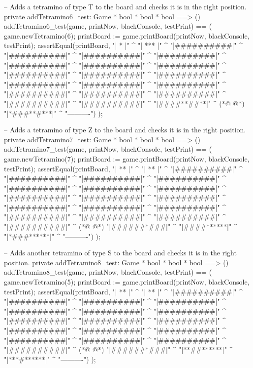 \begin{vdmpp}[breaklines=true]
  -- Adds a tetramino of type T to the board and checks it is in the right position.
  private addTetramino6_test: Game * bool * bool * bool ==> ()
  addTetramino6_test(game, printNow, blackConsole, testPrint) == (  
   game.newTetramino(6);
   printBoard := game.printBoard(printNow, blackConsole, testPrint);
   assertEqual(printBoard, 
    "\n|    *     |" ^
    "\n|   ***    |" ^
    "\n|##########|" ^
    "\n|##########|" ^
    "\n|##########|" ^
    "\n|##########|" ^
    "\n|##########|" ^
    "\n|##########|" ^
    "\n|##########|" ^
    "\n|##########|" ^
    "\n|##########|" ^
    "\n|##########|" ^
    "\n|##########|" ^
    "\n|##########|" ^
    "\n|##########|" ^
    "\n|##########|" ^
    "\n|##########|" ^
    "\n|##########|" ^
    "\n|##########|" ^
    "\n|##########|" ^
    "\n|####**##**|" ^
(*@
\label{addTetramino7:test:222}
@*)
    "\n|*###**#***|" ^
    "\n ----------")
  );

  -- Adds a tetramino of type Z to the board and checks it is in the right position.
  private addTetramino7_test: Game * bool * bool * bool ==> ()
  addTetramino7_test(game, printNow, blackConsole, testPrint) == (  
   game.newTetramino(7);
   printBoard := game.printBoard(printNow, blackConsole, testPrint);
   assertEqual(printBoard, 
    "\n|   **     |" ^
    "\n|    **    |" ^
    "\n|##########|" ^
    "\n|##########|" ^
    "\n|##########|" ^
    "\n|##########|" ^
    "\n|##########|" ^
    "\n|##########|" ^
    "\n|##########|" ^
    "\n|##########|" ^
    "\n|##########|" ^
    "\n|##########|" ^
    "\n|##########|" ^
    "\n|##########|" ^
    "\n|##########|" ^
    "\n|##########|" ^
    "\n|##########|" ^
    "\n|##########|" ^
    "\n|##########|" ^
(*@
\label{addTetramino8:test:251}
@*)
    "\n|######*###|" ^
    "\n|####******|" ^
    "\n|*###******|" ^
    "\n ----------")
  );
  
  -- Adds another tetramino of type S to the board and checks it is in the right position.
  private addTetramino8_test: Game * bool * bool * bool ==> ()
  addTetramino8_test(game, printNow, blackConsole, testPrint) == (  
   game.newTetramino(5);
   printBoard := game.printBoard(printNow, blackConsole, testPrint);
   assertEqual(printBoard, 
    "\n|    **    |" ^
    "\n|   **     |" ^
    "\n|##########|" ^
    "\n|##########|" ^
    "\n|##########|" ^
    "\n|##########|" ^
    "\n|##########|" ^
    "\n|##########|" ^
    "\n|##########|" ^
    "\n|##########|" ^
    "\n|##########|" ^
    "\n|##########|" ^
    "\n|##########|" ^
    "\n|##########|" ^
    "\n|##########|" ^
    "\n|##########|" ^
    "\n|##########|" ^
    "\n|##########|" ^
    "\n|##########|" ^
(*@
\label{moveTetramino1:test:282}
@*)
    "\n|######*###|" ^
    "\n|**##******|" ^
    "\n|***#******|" ^
    "\n ----------")
  );
  

\end{vdmpp}
